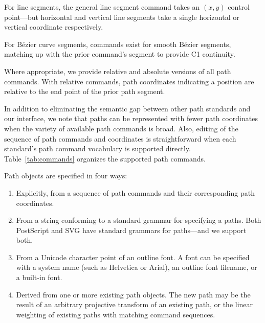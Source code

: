 For line segments, the general line segment command takes an $(x,y)$
control point---but horizontal and vertical line segments take a single
horizontal or vertical coordinate respectively.

For B\'{e}zier curve segments, commands exist for smooth B\'{e}zier
segments, matching up with the prior command's segment to provide C1
continuity.

Where appropriate, we provide relative and absolute versions of all
path commands.  With relative commands, path coordinates indicating a
position are relative to the end point of the prior path segment.

In addition to eliminating the semantic gap between other path standards
and our interface, we note that paths can be represented with fewer
path coordinates when the variety of available path commands is broad.
Also, editing of the sequence of path commands and coordinates
is straightforward when each standard's path command vocabulary is
supported directly.  Table~\ref{tab:commands} organizes the supported
path commands.

Path objects are specified in four ways:
\begin{enumerate}
  \item Explicitly, from a sequence of path commands and their
  corresponding path coordinates.
  \item From a string conforming to a standard grammar for specifying
  a paths.  Both PostScript and SVG have standard grammars for paths---and
  we support both.
  \item From a Unicode character point of an outline font.  A font
  can be specified with a system name (such as Helvetica or Arial),
  an outline font filename, or a built-in font.
  \item Derived from one or more existing path objects.  The new path
  may be the result of an arbitrary projective transform of an existing
  path, or the linear weighting of existing paths with matching command
  sequences.
\end{enumerate}

